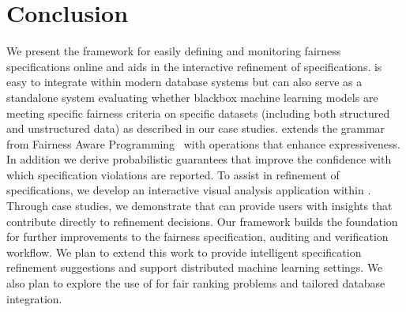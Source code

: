 \section{Conclusion}
We present the \AVOIRmethodname{} framework for easily defining and monitoring fairness specifications online and aids in the interactive refinement of specifications. \AVOIRmethodname{} is easy to integrate within modern database systems but can also serve as a standalone system evaluating whether blackbox machine learning models are meeting specific fairness criteria on specific datasets (including both structured and unstructured data) as described in our case studies.
\AVOIRmethodname{} extends the grammar from Fairness Aware Programming~\cite{albarghouthi2019fairness} with operations that enhance expressiveness.
In addition we derive probabilistic guarantees that improve the confidence with which specification violations are reported.
To assist in refinement of specifications, we develop an interactive visual analysis application within \AVOIRmethodname{}.
Through case studies, we demonstrate that \AVOIRmethodname{} can provide users with insights that contribute directly to refinement decisions.
Our framework builds the foundation for further improvements to the fairness specification, auditing and verification workflow.
We plan to extend this work to provide intelligent specification refinement suggestions and support distributed machine learning settings. We also plan to explore the use of \AVOIRmethodname{} for fair ranking problems and tailored database integration.
